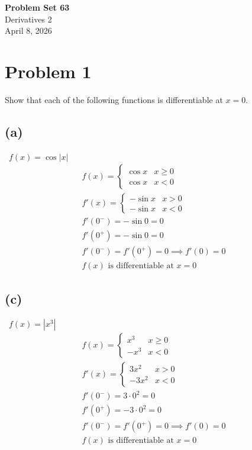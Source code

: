 \documentclass[12pt]{article}
\newcommand*{\abs}[1]{\left|#1\right|}
\newcommand{\vem}{\vspace{0.5em}}
\newcommand{\problem}[1]{\section{Problem #1}}
\newcommand{\subproblem}[1]{\subsection{(#1)} \,}
\begin{document}
\vspace*{0cm}

\begin{center}
    {\Large \bfseries Problem Set 63} \\[0.5cm]
    {\large Derivatives 2} \\[0.35cm]
    {\normalsize April 8, 2026}
\end{center}


\problem{1}
Show that each of the following functions is differentiable at $x = 0$. \vem

\subproblem{a} $f(x)=\cos \abs x$
\begin{gather*}
    f(x)=\begin{cases}
        \cos x &x \ge 0\\
        \cos x &x<0
    \end{cases}\\
    f'(x)=\begin{cases}
        - \sin x & x>0\\
        - \sin x & x<0
    \end{cases} \\
    f'(0^-)=-\sin 0=0\\
    f'(0^+)= -\sin 0 =0\\
    f'(0^-)=f'(0^+)=0 \implies f'(0)=0\\
    \boxed{f(x) \text{ is differentiable at $x=0$}}
\end{gather*}

\subproblem{c} $f(x)=|x^3|$
\begin{gather*}
    f(x)=\begin{cases}
        x^3 &x\ge 0\\
        -x^3 &x<0
    \end{cases}\\
    f'(x)=\begin{cases}
        3x^2 &x>0\\
        -3x^2 &x<0
    \end{cases}\\
    f'(0^-)=3\cdot0^2=0\\
    f'(0^+)=-3\cdot 0^2=0\\
    f'(0^-)=f'(0^+)=0 \implies f'(0)=0\\
    \boxed{f(x) \text{ is differentiable at $x=0$}}
\end{gather*}
\end{document}
